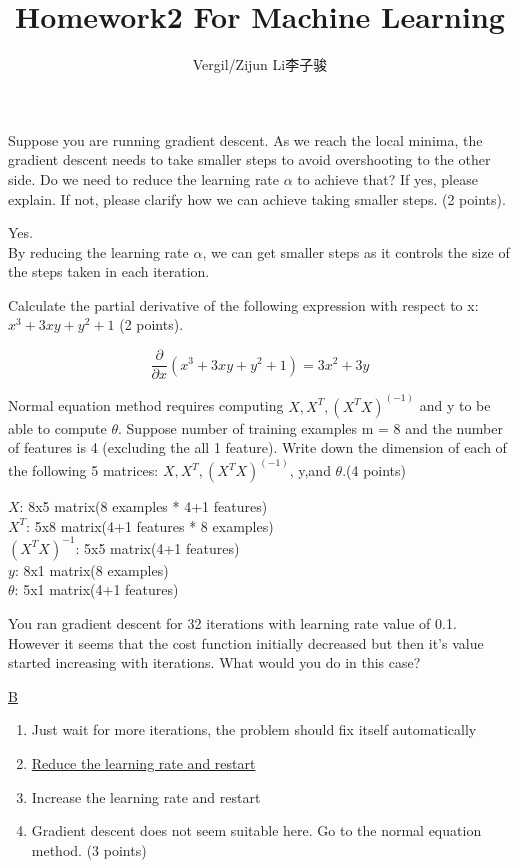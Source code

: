 \documentclass[a4paper]{article}
\author{Vergil/Zijun Li李子骏}
\title{Homework2 For Machine Learning}
\date{\vspace{-5ex}}
\begin{document}
\maketitle

\begin{enumerate}

    {\bf\item Suppose you are running gradient descent. As we reach the local minima, the gradient descent needs to take smaller steps to avoid overshooting to the other side. Do we need to reduce the learning rate $\alpha$ to achieve that? If yes, please explain. If not, please clarify how we can achieve taking smaller steps. (2 points).}

    Yes.\\
    By reducing the learning rate $\alpha$, we can get smaller steps as it controls the size of the steps taken in each iteration.

    {\bf\item Calculate the partial derivative of the following expression with respect to x: $x^3 + 3xy + y^2 + 1$ (2 points).}

    $$\frac{\partial}{\partial x} (x^3 + 3xy + y^2 + 1) = 3x^2 + 3y$$

    {\bf\item Normal equation method requires computing $X, X^T, (X^TX)^{(-1)}$ and y to be able to compute $\theta$. Suppose number of training examples m = 8 and the number of features is 4 (excluding the all 1 feature). Write down the dimension of each of the following 5 matrices: $X, X^T, (X^TX)^{(-1)}$, y,and $\theta$.(4 points)}

    $X$: 8x5 matrix(8 examples * 4+1 features)\\
    $X^T$: 5x8 matrix(4+1 features * 8 examples)\\
    $(X^TX)^{-1}$: 5x5 matrix(4+1 features)\\
    $y$: 8x1 matrix(8 examples)\\
    $\theta$: 5x1 matrix(4+1 features)


    {\bf\item You ran gradient descent for 32 iterations with learning rate value of 0.1. However it seems that the cost function initially decreased but then it's value started increasing with iterations. What would you do in this case?} \underline{B}

        \begin{enumerate}[label=(\Alph*)]
            \item Just wait for more iterations, the problem should fix itself automatically
            \item \underline{Reduce the learning rate and restart}
            \item Increase the learning rate and restart
            \item Gradient descent does not seem suitable here. Go to the normal equation method. (3 points)
        \end{enumerate}


\end{enumerate}
\end{document}
